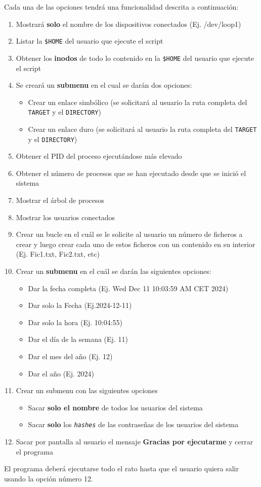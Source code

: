 \documentclass[11pt]{article}
\begin{document}
Cada una de las opciones tendrá una funcionalidad descrita a continuación:
\begin{enumerate}
\item Mostrará \textbf{solo} el nombre de los dispositivos conectados (Ej. /dev/loop1)
\item Listar la \texttt{\$HOME} del usuario que ejecute el script
\item Obtener los \textbf{inodos} de todo lo contenido en la \texttt{\$HOME} del usuario que ejecute el script
\item Se creará un \textbf{submenu} en el cual se darán dos opciones:
\begin{itemize}
\item Crear un enlace simbólico (se solicitará al usuario la ruta completa del \texttt{TARGET} y el \texttt{DIRECTORY})
\item Crear un enlace duro (se solicitará al usuario la ruta completa del \texttt{TARGET} y el \texttt{DIRECTORY})
\end{itemize}
\item Obtener el PID del proceso ejecutándose más elevado
\item Obtener el número de procesos que se han ejecutado desde que se inició el sistema
\item Mostrar el árbol de procesos
\item Mostrar los usuarios conectados
\item Crear un bucle en el cuál se le solicite al usuario un número de ficheros a crear y luego
crear cada uno de estos ficheros con un contenido en su interior (Ej. Fic1.txt, Fic2.txt, etc)
\item Crear un \textbf{submenu} en el cuál se darán las siguientes opciones:
\begin{itemize}
\item Dar la fecha completa (Ej. Wed Dec 11 10:03:59 AM CET 2024)
\item Dar solo la Fecha (Ej.2024-12-11)
\item Dar solo la hora (Ej. 10:04:55)
\item Dar el día de la semana (Ej. 11)
\item Dar el mes del año (Ej. 12)
\item Dar el año (Ej. 2024)
\end{itemize}
\item Crear un submenu con las siguientes opciones
\begin{itemize}
\item Sacar \textbf{solo el nombre} de todos los usuarios del sistema
\item Sacar \textbf{solo} los \emph{\texttt{hashes}} de las contraseñas de los usuarios del sistema
\end{itemize}
\item Sacar por pantalla al usuario el mensaje \textbf{Gracias por ejecutarme} y cerrar el programa
\end{enumerate}


El programa deberá ejecutarse todo el rato hasta que el usuario quiera salir usando la opción
número 12.
\end{document}
